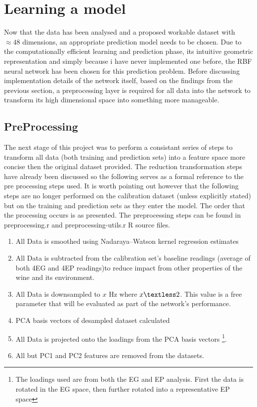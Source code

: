 \documentclass[twocolumn]{article}
\begin{document}
\section{Learning a model}
Now that the data has been analysed and a proposed workable dataset with $\approx48$ dimensions, an appropriate prediction model needs to be chosen.
Due to the computationally efficient learning and prediction phase, its intuitive geometric representation and simply because i have never
implemented one before, the RBF neural network has been chosen for this prediction problem. Before discussing implementation details
of the network itself, based on the findings from the previous section, a preprocessing layer is required for all data into the network
to transform its high dimensional space into something more manageable. 
\subsection{PreProcessing}
The next stage of this project was to perform a consistant series of steps to transform all data (both training and prediction sets) into a
feature space more concise then the original dataset provided. The reduction transformation steps have already been discussed so the following
serves as a formal reference to the pre processing steps used. It is worth pointing out however that the following steps are no longer performed
on the calibration dataset (unless explicitly stated) but on the training and prediction sets as they enter the model. The order that the processing
occurs is as presented. The preprocessing steps can be found in preprocessing.r and preprocessing-utils.r R source files.

\begin{enumerate}
	\item All Data is smoothed using Nadaraya–Watson kernel regression estimates
	\item All Data is subtracted from the calibration set's baseline readings (average of both 4EG and 4EP readings)to reduce impact from 
		  other properties of the wine and its environment.
	\item All Data is downsampled to $x$ Hz where $x \textless 2$. This value is a free parameter that will be evaluated as part of the network's performance.
	\item PCA basis vectors of desampled dataset calculated 
	\item All Data is projected onto the loadings from the PCA basis vectors \footnote{The loadings used are from both the EG and EP analysis. First the
		  data is rotated in the EG space, then further rotated into a representative EP space}.
	\item All but PC1 and PC2 features are removed from the datasets.
	
\end{enumerate}
\end{document}
